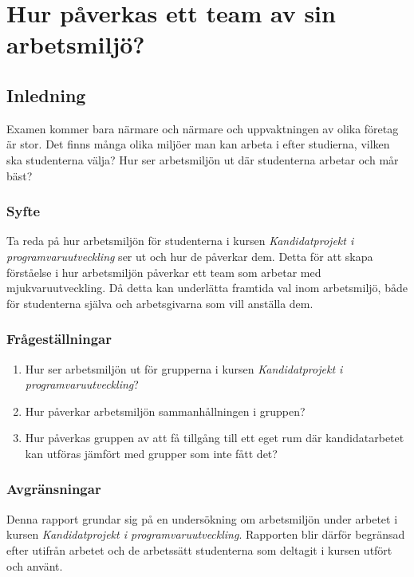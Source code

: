 \chapter{Hur påverkas ett team av sin arbetsmiljö?}
\label{cha:indiv-report-hampus}

\section{Inledning}
\label{sec:introduction-hampus}

Examen kommer bara närmare och närmare och uppvaktningen av olika företag är stor. Det finns många olika miljöer man kan arbeta i efter studierna, vilken ska studenterna välja? Hur ser arbetsmiljön ut där studenterna arbetar och mår bäst?

\subsection{Syfte}
\label{sec:purpose-hampus}

Ta reda på hur arbetsmiljön för studenterna i kursen \textit{Kandidatprojekt i programvaruutveckling} ser ut och hur de påverkar dem. Detta för att skapa förståelse i hur arbetsmiljön påverkar ett team som arbetar med mjukvaruutveckling. Då detta kan underlätta framtida val inom arbetsmiljö, både för studenterna själva och arbetsgivarna som vill anställa dem.

\subsection{Frågeställningar}
\label{sec:issue-hampus}

\begin{enumerate}
\item Hur ser arbetsmiljön ut för grupperna i kursen \textit{Kandidatprojekt i programvaruutveckling}?
\item Hur påverkar arbetsmiljön sammanhållningen i gruppen?
\item Hur påverkas gruppen av att få tillgång till ett eget rum där kandidatarbetet kan utföras jämfört med grupper som inte fått det?
\end{enumerate}

\subsection{Avgränsningar}
Denna rapport grundar sig på en undersökning om arbetsmiljön under arbetet i kursen \textit{Kandidatprojekt i programvaruutveckling}. Rapporten blir därför begränsad efter utifrån arbetet och de arbetssätt studenterna som deltagit i kursen utfört och använt.

